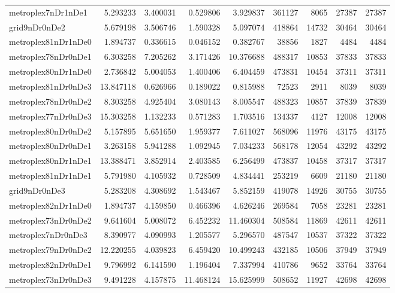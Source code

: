 \begin{longtable}{|l|r|r|r|r|r|r|r|r|}
metroplex7nDr1nDe1 & 5.293233 & 3.400031 & 0.529806 & 3.929837 & 361127 & 8065 & 27387 & 27387 \\
grid9nDr0nDe2 & 5.679198 & 3.506746 & 1.590328 & 5.097074 & 418864 & 14732 & 30464 & 30464 \\
metroplex81nDr1nDe0 & 1.894737 & 0.336615 & 0.046152 & 0.382767 & 38856 & 1827 & 4484 & 4484 \\
metroplex78nDr0nDe1 & 6.303258 & 7.205262 & 3.171426 & 10.376688 & 488317 & 10853 & 37833 & 37833 \\
metroplex80nDr1nDe0 & 2.736842 & 5.004053 & 1.400406 & 6.404459 & 473831 & 10454 & 37311 & 37311 \\
metroplex81nDr0nDe3 & 13.847118 & 0.626966 & 0.189022 & 0.815988 & 72523 & 2911 & 8039 & 8039 \\
metroplex78nDr0nDe2 & 8.303258 & 4.925404 & 3.080143 & 8.005547 & 488323 & 10857 & 37839 & 37839 \\
metroplex77nDr0nDe3 & 15.303258 & 1.132233 & 0.571283 & 1.703516 & 134337 & 4127 & 12008 & 12008 \\
metroplex80nDr0nDe2 & 5.157895 & 5.651650 & 1.959377 & 7.611027 & 568096 & 11976 & 43175 & 43175 \\
metroplex80nDr0nDe1 & 3.263158 & 5.941288 & 1.092945 & 7.034233 & 568178 & 12054 & 43292 & 43292 \\
metroplex80nDr1nDe1 & 13.388471 & 3.852914 & 2.403585 & 6.256499 & 473837 & 10458 & 37317 & 37317 \\
metroplex81nDr1nDe1 & 5.791980 & 4.105932 & 0.728509 & 4.834441 & 253219 & 6609 & 21180 & 21180 \\
grid9nDr0nDe3 & 5.283208 & 4.308692 & 1.543467 & 5.852159 & 419078 & 14926 & 30755 & 30755 \\
metroplex82nDr1nDe0 & 1.894737 & 4.159850 & 0.466396 & 4.626246 & 269584 & 7058 & 23281 & 23281 \\
metroplex73nDr0nDe2 & 9.641604 & 5.008072 & 6.452232 & 11.460304 & 508584 & 11869 & 42611 & 42611 \\
metroplex7nDr0nDe3 & 8.390977 & 4.090993 & 1.205577 & 5.296570 & 487547 & 10537 & 37322 & 37322 \\
metroplex79nDr0nDe2 & 12.220255 & 4.039823 & 6.459420 & 10.499243 & 432185 & 10506 & 37949 & 37949 \\
metroplex82nDr0nDe1 & 9.796992 & 6.141590 & 1.196404 & 7.337994 & 410786 & 9652 & 33764 & 33764 \\
metroplex73nDr0nDe3 & 9.491228 & 4.157875 & 11.468124 & 15.625999 & 508652 & 11927 & 42698 & 42698 \\

\end{longtable}
